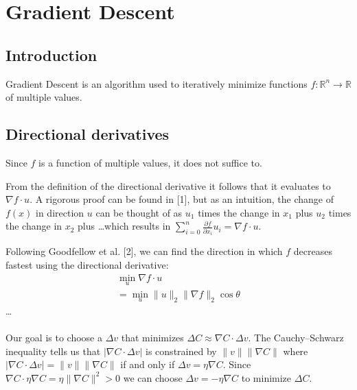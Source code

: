 \section{Gradient Descent}
\subsection{Introduction}
Gradient Descent is an algorithm used to iteratively minimize functions $f: \mathbb{R}^n \to \mathbb{R}$ of multiple values.

\subsection{Directional derivatives}
Since $f$ is a function of multiple values, it does not suffice to.

From the definition of the directional derivative it follows that it evaluates to $\nabla f \cdot u$. A rigorous proof can be found in [1], but as an intuition, the change of $f(x)$ in direction $u$ can be thought of as $u_1$ times the change in $x_1$ plus $u_2$ times the change in $x_2$ plus \ldots which results in $\sum_{i=0}^{n}\frac{\partial f}{\partial x_i}u_i = \nabla f \cdot u$.

Following Goodfellow et al. [2], we can find the direction in which $f$ decreases fastest using the directional derivative:
\begin{equation*}
\begin{gathered}
\min_u \nabla f \cdot u \\
= \min_u \lVert u \rVert_2 \lVert \nabla f \rVert_2 \cos \theta
\end{gathered}
\end{equation*}
\ldots
\\\\
Our goal is to choose a $\Delta v$ that minimizes $\Delta C \approx \nabla C \cdot \Delta v$. The Cauchy--Schwarz inequality tells us that $|\nabla C \cdot \Delta v|$ is constrained by $\lVert v \rVert \lVert \nabla C \rVert$ where $|\nabla C \cdot \Delta v| = \lVert v \rVert \lVert \nabla C \rVert$ if and only if $\Delta v = \eta \nabla C$.
Since $\nabla C \cdot \eta \nabla C = \eta \lVert \nabla C \rVert^2 > 0$ we can choose $\Delta v = -\eta \nabla C$ to minimize $\Delta C$.


